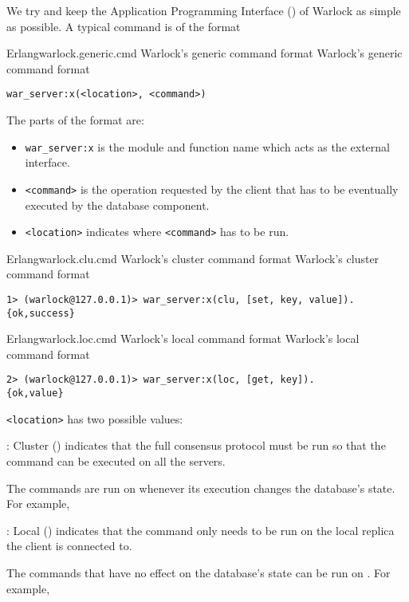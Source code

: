 We try and keep the Application Programming Interface () of Warlock as
simple as possible. A typical command is of the format

\begin{scode}{Erlang}{warlock.generic.cmd}{%
  Warlock's generic command format}{%
  Warlock's generic command format}
  \begin{lstlisting}
war_server:x(<location>, <command>)
  \end{lstlisting}
\end{scode}

The parts of the format are:

\begin{itemize}
  \item \texttt{war\_server:x} is the module and function name which acts
    as the external interface.
  \item \texttt{<command>} is the operation requested by the client that has to
    be eventually executed by the database component.
  \item \texttt{<location>} indicates where \texttt{<command>} has to be
    run.
\end{itemize}

\begin{scode}{Erlang}{warlock.clu.cmd}{%
  Warlock's cluster command format}{%
  Warlock's cluster command format}
  \begin{lstlisting}
1> (warlock@127.0.0.1)> war_server:x(clu, [set, key, value]).
{ok,success}
  \end{lstlisting}
\end{scode}


\begin{scode}{Erlang}{warlock.loc.cmd}{%
  Warlock's local command format}{%
  Warlock's local command format}
  \begin{lstlisting}
2> (warlock@127.0.0.1)> war_server:x(loc, [get, key]).
{ok,value}
  \end{lstlisting}
\end{scode}

\texttt{<location>} has two possible values:

\begin{itemize}
    : Cluster () indicates that the full
    consensus protocol must be run so that the command can be executed
    on all the servers.

    The commands are run on  whenever its execution changes
    the database's state. For example, 

    : Local () indicates that the command only
    needs to be run on the local replica the client is connected to.

    The commands that have no effect on the database's state can be run
    on . For example, 
\end{itemize}

